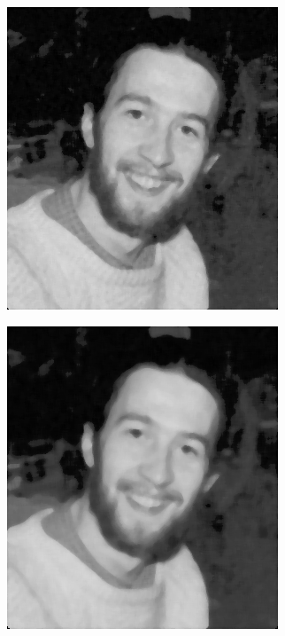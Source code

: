 \documentclass[12pt,a4paper]{report}
\begin{document}
\begin{figure}[!htb]
\begin{minipage}{\linewidth}
    \begin{subfigure}{0.49\textwidth}
      \includegraphics[width=\linewidth]{output/noise2_q2_K5P2.png}
    \end{subfigure}
    \begin{subfigure}{0.49\textwidth}
      \includegraphics[width=\linewidth]{output/noise2_q2_K7P3.png}
    \end{subfigure}


\end{minipage}
\end{figure}
\end{document}
